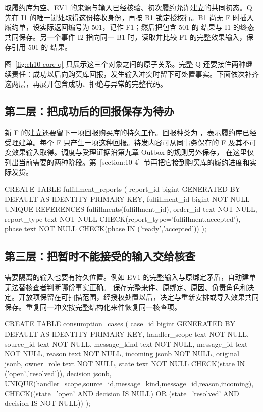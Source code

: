 取履约库为空、EV1 的来源与输入已经核验、初次履约允许建立的共同初态。Q 先在 I1 的唯一键处取得这份接收身份，再按 B1 锁定授权行。B1 尚无 F 时插入履约单，设实际返回编号为 501，记作 F1；然后把包含 501 的  结果与 I1 的终态共同保存。另一个事件 I2 指向同一 B1 时，读取并比较 F1 的完整效果输入，保存引用 501 的  结果。

图~\ref{fig:ch10-core-q} 只展示这三个对象之间的原子关系。完整 Q 还要接住两种继续责任：成功以后向购买库回报，发生输入冲突时留下可处置事实。下面依次补齐这两层，再展开包含成功、拒绝与异常的完整代码。


\subsection*{第二层：把成功后的回报保存为待办}

新 F 的建立还要留下一项回报购买库的持久工作。回报种类为 ，表示履约库已经受理建单。每个 F 只产生一项这种回报。待发内容可从同事务保存的 F 及其不可变效果输入取得。调度与受理证据沿第九章 Outbox 的规则另外保存， 在这里仅列出当前需要的两种阶段。第~\ref{section:10-4}~节再把它接到购买库的履约进度和实际发货。

\begin{BookCode}
CREATE TABLE fulfillment_reports (
  report_id bigint GENERATED BY DEFAULT AS IDENTITY PRIMARY KEY,
  fulfillment_id bigint NOT NULL UNIQUE REFERENCES fulfillments(fulfillment_id),
  order_id text NOT NULL,
  report_type text NOT NULL CHECK(report_type='fulfillment.accepted'),
  phase text NOT NULL CHECK(phase IN ('ready','accepted'))
);
\end{BookCode}

\subsection*{第三层：把暂时不能接受的输入交给核查}

需要隔离的输入也要有持久位置。例如 EV1 的完整输入与原绑定矛盾，自动建单无法替核查者判断哪份事实正确。 保存完整来件、原绑定、原因、负责角色和决定。开放项保留在可扫描范围，经授权处置以后，决定与重新安排或导入效果共同保存。重复同一冲突按完整结构化来件恢复同一核查项。

\begin{BookCode}
CREATE TABLE consumption_cases (
  case_id bigint GENERATED BY DEFAULT AS IDENTITY PRIMARY KEY,
  handler_scope text NOT NULL, source_id text NOT NULL,
  message_kind text NOT NULL, message_id text NOT NULL,
  reason text NOT NULL, incoming jsonb NOT NULL, original jsonb,
  owner_role text NOT NULL,
  state text NOT NULL CHECK(state IN ('open','resolved')),
  decision jsonb,
  UNIQUE(handler_scope,source_id,message_kind,message_id,reason,incoming),
  CHECK((state='open' AND decision IS NULL)
     OR (state='resolved' AND decision IS NOT NULL))
);
\end{BookCode}


